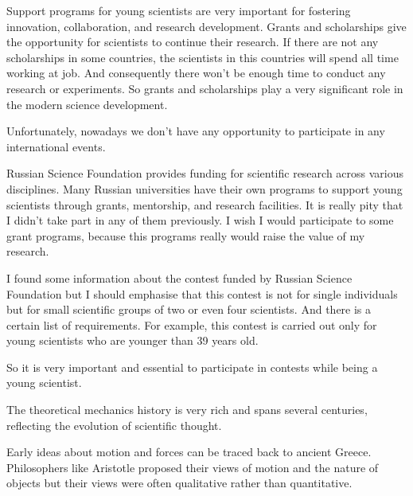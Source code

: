 \documentclass[main.tex]{subfiles}
\begin{document}
\setcounter{subsection}{5}

Support programs for young scientists are very important for fostering innovation, collaboration, and research development.
Grants and scholarships give the opportunity for scientists to continue their research.
If there are not any scholarships in some countries, the scientists in this countries will spend all time working at job.
And consequently there won't be enough time to conduct any research or experiments.
So grants and scholarships play a very significant role in the modern science development.

Unfortunately, nowadays we don't have any opportunity to participate in any international events.

Russian Science Foundation provides funding for scientific research across various disciplines.
Many Russian universities have their own programs to support young scientists through grants, mentorship, and research facilities.
It is really pity that I didn't take part in any of them previously.
I wish I would participate to some grant programs, because this programs really would raise the value of my research.

I found some information about the contest funded by Russian Science Foundation but I should emphasise that this contest is not for single individuals but for small scientific groups of two or even four scientists.
And there is a certain list of requirements.
For example, this contest is carried out only for young scientists who are younger than 39 years old.

So it is very important and essential to participate in contests while being a young scientist.
\\


\newpage

\setcounter{subsection}{6}

The theoretical mechanics history is very rich and spans several centuries, reflecting the evolution of scientific thought.

Early ideas about motion and forces can be traced back to ancient Greece.
Philosophers like Aristotle proposed their views of motion and the nature of objects but their views were often qualitative rather than quantitative.
\\
\end{document}
